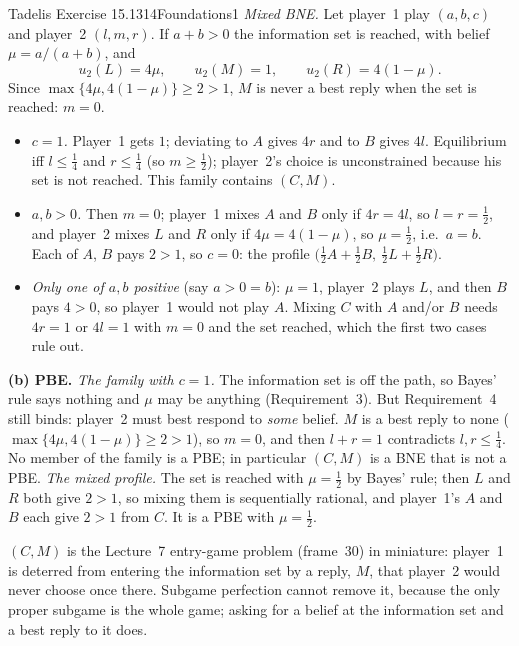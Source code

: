 \begin{exsol}{Tadelis Exercise 15.1}{314}{Foundations}{1}
\emph{Mixed BNE.} Let player~1 play $(a, b, c)$ and player~2 $(l, m, r)$. If $a + b > 0$ the information
set is reached, with belief $\mu = a/(a+b)$, and
\[
  u_2(L) = 4\mu, \qquad u_2(M) = 1, \qquad u_2(R) = 4(1 - \mu).
\]
Since $\max\{4\mu, 4(1-\mu)\} \ge 2 > 1$, $M$ is never a best reply when the set is reached: $m = 0$.
\begin{itemize}
  \item \emph{$c = 1$.} Player~1 gets $1$; deviating to $A$ gives $4r$ and to $B$ gives $4l$. Equilibrium
  iff $l \le \frac14$ and $r \le \frac14$ (so $m \ge \frac12$); player~2's choice is unconstrained because
  his set is not reached. This family contains $(C, M)$.
  \item \emph{$a, b > 0$.} Then $m = 0$; player~1 mixes $A$ and $B$ only if $4r = 4l$, so $l = r = \frac12$,
  and player~2 mixes $L$ and $R$ only if $4\mu = 4(1-\mu)$, so $\mu = \frac12$, i.e.\ $a = b$. Each of $A$,
  $B$ pays $2 > 1$, so $c = 0$: the profile $\bigl(\frac12 A + \frac12 B,\ \frac12 L + \frac12 R\bigr)$.
  \item \emph{Only one of $a, b$ positive} (say $a > 0 = b$): $\mu = 1$, player~2 plays $L$, and then $B$
  pays $4 > 0$, so player~1 would not play $A$. Mixing $C$ with $A$ and/or $B$ needs $4r = 1$ or
  $4l = 1$ with $m = 0$ and the set reached, which the first two cases rule out.
\end{itemize}

\textbf{(b) PBE.} \emph{The family with $c = 1$.} The information set is off the path, so Bayes' rule says
nothing and $\mu$ may be anything (Requirement~3). But Requirement~4 still binds: player~2 must best
respond to \emph{some} belief. $M$ is a best reply to none ($\max\{4\mu, 4(1-\mu)\} \ge 2 > 1$), so
$m = 0$, and then $l + r = 1$ contradicts $l, r \le \frac14$. No member of the family is a PBE; in
particular $(C, M)$ is a BNE that is not a PBE. \emph{The mixed profile.} The set is reached with
$\mu = \frac12$ by Bayes' rule; then $L$ and $R$ both give $2 > 1$, so mixing them is sequentially
rational, and player~1's $A$ and $B$ each give $2 > 1$ from $C$. It is a PBE with $\mu = \frac12$.

\interp $(C, M)$ is the Lecture~7 entry-game problem (frame~30) in miniature: player~1 is deterred from
entering the information set by a reply, $M$, that player~2 would never choose once there. Subgame
perfection cannot remove it, because the only proper subgame is the whole game; asking for a belief at
the information set and a best reply to it does.


\end{exsol}
